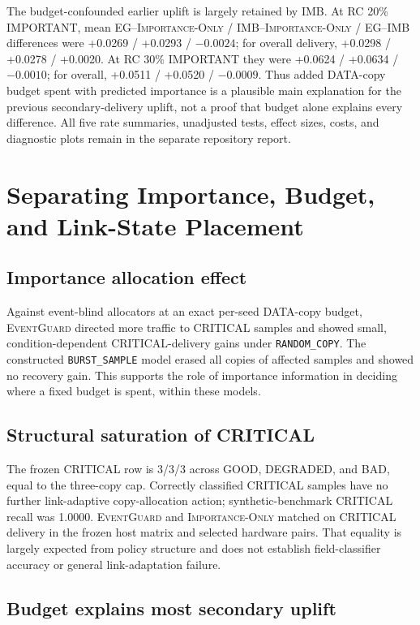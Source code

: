 \documentclass[11pt]{article}
\newcommand{\EG}{\textsc{EventGuard}}
\newcommand{\IO}{\textsc{Importance-Only}}
\begin{document}
The budget-confounded earlier uplift is largely retained by IMB. At RC 20\% IMPORTANT, mean EG--\IO{} / IMB--\IO{} / EG--IMB differences were +0.0269 / +0.0293 / $-0.0024$; for overall delivery, +0.0298 / +0.0278 / +0.0020. At RC 30\% IMPORTANT they were +0.0624 / +0.0634 / $-0.0010$; for overall, +0.0511 / +0.0520 / $-0.0009$. Thus added DATA-copy budget spent with predicted importance is a plausible main explanation for the previous secondary-delivery uplift, not a proof that budget alone explains every difference. All five rate summaries, unadjusted tests, effect sizes, costs, and diagnostic plots remain in the separate repository report.

\section{Separating Importance, Budget, and Link-State Placement}\label{sec:importance-budget-placement}

\subsection{Importance allocation effect}

Against event-blind allocators at an exact per-seed DATA-copy budget, \EG{} directed more traffic to CRITICAL samples and showed small, condition-dependent CRITICAL-delivery gains under \texttt{RANDOM\_COPY}. The constructed \texttt{BURST\_SAMPLE} model erased all copies of affected samples and showed no recovery gain. This supports the role of importance information in deciding where a fixed budget is spent, within these models.

\subsection{Structural saturation of CRITICAL}

The frozen CRITICAL row is 3/3/3 across GOOD, DEGRADED, and BAD, equal to the three-copy cap. Correctly classified CRITICAL samples have no further link-adaptive copy-allocation action; synthetic-benchmark CRITICAL recall was 1.0000. \EG{} and \IO{} matched on CRITICAL delivery in the frozen host matrix and selected hardware pairs. That equality is largely expected from policy structure and does not establish field-classifier accuracy or general link-adaptation failure.

\subsection{Budget explains most secondary uplift}
\end{document}
